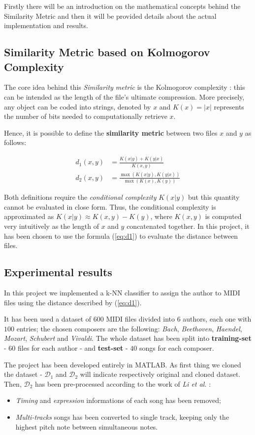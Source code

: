 \documentclass[a4paper]{article}
\begin{document}
	Firstly there will be an introduction on the mathematical concepts behind the Similarity Metric and then it will be provided details about the actual implementation and results.
	
	\subsection{Similarity Metric based on Kolmogorov Complexity}
	The core idea behind this \textit{Similarity metric} is the Kolmogorov complexity \cite{kolmogorov_deep}: this can be intended as the length of the file's ultimate compression. More precisely, any object can be coded into strings, denoted by $x$ and $K(x) = |x|$ represents the number of bits needed to computationally retrieve $x$.
	
	Hence, it is possible to define the \textbf{similarity metric} between two files $x$ and $y$ as follows:
	
	\begin{align}
		\label{eq:d1}
		d_1(x,y) &= \frac{K(x|y) + K(y|x)}{K(x,y)} \\
		\label{eq:d2}
		d_2(x,y) &= \frac{\max{\left(K(x|y),K(y|x)\right)}}{\max{\left(K(x),K(y)\right)}}
	\end{align}
	
	Both definitions require the \textit{conditional complexity} $K(x|y)$ but this quantity cannot be evaluated in close form. Thus, the conditional complexity is approximated as $K(x|y) \approx K(x,y) - K(y)$, where $K(x,y)$ is computed very intuitively as the length of $x$ and $y$ concatenated together. In this project, it has been chosen to use the formula (\ref{eq:d1}) to evaluate the distance between files.
	
	\subsection{Experimental results}
	In this project we implemented a k-NN classifier to assign the author to MIDI files using the distance described by (\ref{eq:d1}). 
	
	It has been used a dataset of $600$ MIDI files divided into $6$ authors, each one with $100$ entries; the chosen composers are the following: \textit{Bach}, \textit{Beethoven}, \textit{Haendel}, \textit{Mozart}, \textit{Schubert} and \textit{Vivaldi}. The whole dataset has been split into \textbf{training-set} - $60$ files for each author -  and \textbf{test-set} - $40$ songs for each composer. 
	
	The project has been developed entirely in MATLAB. As first thing we cloned the dataset - $\mathcal{D}_1$ and $\mathcal{D}_2$ will indicate respectively original and cloned dataset. Then, $\mathcal{D}_2$ has been pre-processed according to the work of \textit{Li et al.} \cite{melody_class}:
	\begin{itemize}
		\item \textit{Timing} and \textit{expression} informations of each song has been removed;
		\item \textit{Multi-tracks} songs has been converted to single track, keeping only the highest pitch note between simultaneous notes.
	\end{itemize}
	
\end{document}
